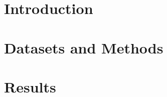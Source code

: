\documentclass[preprint,12pt,authoryear]{elsarticle}
\begin{document}
\begin{frontmatter}

  \title{\myTitle} %


  \author[1]{\myName} %
  \author[]{\correspondingAuthorName {}}


  \begin{abstract}
    Abstract text.
  \end{abstract}

  \begin{graphicalabstract}
  \end{graphicalabstract}
 
  \highlight

  \begin{keyword}



  \end{keyword}

\end{frontmatter}



\section{Introduction}
\label{sec:introduction}


\section{Datasets and Methods}
\label{sec:data-methods}

\section{Results}
\label{sec:results}
\end{document}

